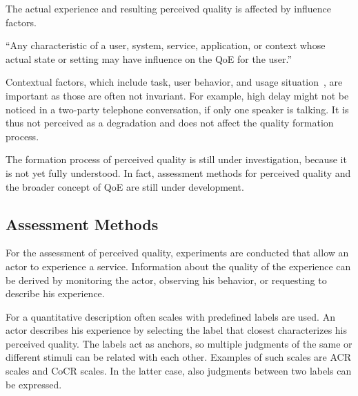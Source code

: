 The actual experience and resulting perceived quality is affected by influence factors.
\begin{definition}
``Any characteristic of a user, system, service, application, or context whose actual state or setting may have influence on the \ac{QoE} for the user.''~\citep[][p.~56]{reiter_factors_2014}
\end{definition}
Contextual factors, which include task, user behavior, and usage situation~\citep[][p.~56]{reiter_factors_2014}, are important as those are often not invariant.
For example, high delay might not be noticed in a two-party telephone conversation, if only one speaker is talking.
It is thus not perceived as a degradation and does not affect the quality formation process. %

The formation process of perceived quality is still under investigation, because it is not yet fully understood. %
In fact, assessment methods for perceived quality and the broader concept of \ac{QoE} are still under development.

\subsection{Assessment Methods}
For the assessment of perceived quality, experiments are conducted that allow an actor to experience a service.
Information about the quality of the experience can be derived by monitoring the actor, observing his behavior, or requesting to describe his experience.

For a quantitative description often scales with predefined labels are used.
An actor describes his experience by selecting the label that closest characterizes his perceived quality.
The labels act as anchors, so multiple judgments of the same or different stimuli can be related with each other.
Examples of such scales are \acf{ACR} scales and \acf{CoCR} scales.
In the latter case, also judgments between two labels can be expressed.

